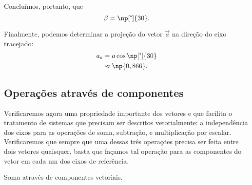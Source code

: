 \noindent{}Concluímos, portanto, que
\begin{equation}
    \beta = \np[\tcdegree]{30}.
\end{equation}

Finalmente, podemos determinar a projeção do vetor $\vec{a}$ na direção do eixo tracejado:
\begin{align}
    a_e &= a\cos\np[\tcdegree]{30} \\
    &\approx \np{0,866}.
\end{align}

\subsection{Operações através de componentes}
\label{Sec:OpAtravesDeComp}

Verificaremos agora uma propriedade importante dos vetores e que facilita o tratamento de sistemas que precisam ser descritos vetorialmente: a independência dos eixos para as operações de soma, subtração, e multiplicação por escalar. Verificaremos que sempre que uma dessas três operações precisa ser feita entre dois vetores quaisquer, basta que façamos tal operação para as componentes do vetor em cada um dos eixos de referência.

\begin{marginfigure}[2cm]
\centering
{}
\caption{Soma através de componentes vetoriais.\label{Fig:Soma_comp}}
\end{marginfigure}

